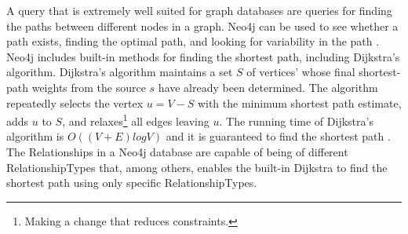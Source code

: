 A query that is extremely well suited for graph databases are queries for finding the paths between different nodes in a graph. Neo4j can be used to see whether a path exists, finding the optimal path, and looking for variability in the path \citep[p. 51]{bruggen14}. Neo4j includes built-in methods for finding the shortest path, including Dijkstra's algorithm. Dijkstra's algorithm \cite[p.658-662]{cormen09} maintains a set $S$ of vertices' whose final shortest-path weights from the source $s$ have already been determined. The algorithm repeatedly selects the vertex $u = V - S$ with the minimum shortest path estimate, adds $u$ to $S$, and relaxes\footnote{Making a change that reduces constraints.} all edges leaving $u$. The running time of Dijkstra's algorithm is $O((V + E)log V)$ and it is guaranteed to find the shortest path \cite[p.~661]{cormen09}. %
The Relationships in a Neo4j database are capable of being of different RelationshipTypes that, among others, enables the built-in Dijkstra to find the shortest path using only specific RelationshipTypes.





